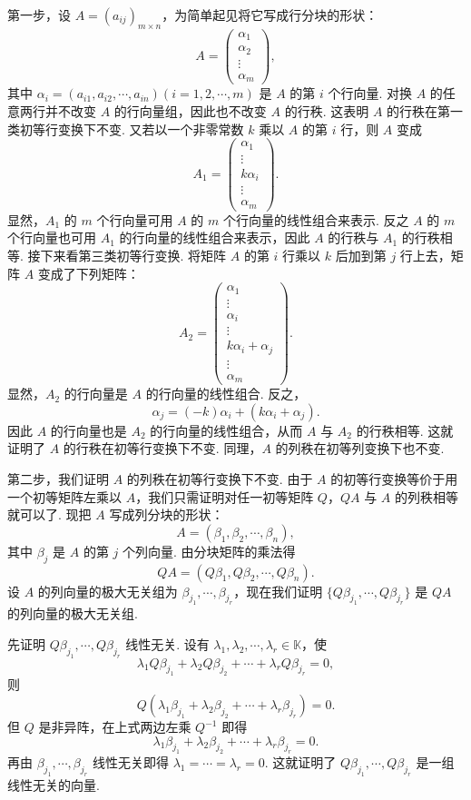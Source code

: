\documentclass[UTF8,12pt,a4paper,fontset=fandol]{ctexart}
\begin{document}
第一步，设 $A=(a_{ij})_{m\times n}$，为简单起见将它写成行分块的形状：
\[
A=\left(\begin{array}{c}
\alpha_1\\
\alpha_2\\
\vdots\\
\alpha_m
\end{array}\right),
\]
其中 $\alpha_i=(a_{i1},a_{i2},\cdots,a_{in})(i=1,2,\cdots,m)$ 是 $A$ 的第 $i$ 个行向量. 对换 $A$ 的任意两行并不改变 $A$ 的行向量组，因此也不改变 $A$ 的行秩. 这表明 $A$ 的行秩在第一类初等行变换下不变. 又若以一个非零常数 $k$ 乘以 $A$ 的第 $i$ 行，则 $A$ 变成
\[
A_1=\left(\begin{array}{c}
\alpha_1\\
\vdots\\
k\alpha_i\\
\vdots\\
\alpha_m
\end{array}\right).
\]
显然，$A_1$ 的 $m$ 个行向量可用 $A$ 的 $m$ 个行向量的线性组合来表示. 反之 $A$ 的 $m$ 个行向量也可用 $A_1$ 的行向量的线性组合来表示，因此 $A$ 的行秩与 $A_1$ 的行秩相等. 接下来看第三类初等行变换. 将矩阵 $A$ 的第 $i$ 行乘以 $k$ 后加到第 $j$ 行上去，矩阵 $A$ 变成了下列矩阵：
\[
A_2=\left(\begin{array}{c}
\alpha_1\\
\vdots\\
\alpha_i\\
\vdots\\
k\alpha_i+\alpha_j\\
\vdots\\
\alpha_m
\end{array}\right).
\]
显然，$A_2$ 的行向量是 $A$ 的行向量的线性组合. 反之，
\[
\alpha_j=(-k)\alpha_i+(k\alpha_i+\alpha_j).
\]
因此 $A$ 的行向量也是 $A_2$ 的行向量的线性组合，从而 $A$ 与 $A_2$ 的行秩相等. 这就证明了 $A$ 的行秩在初等行变换下不变. 同理，$A$ 的列秩在初等列变换下也不变.

第二步，我们证明 $A$ 的列秩在初等行变换下不变. 由于 $A$ 的初等行变换等价于用一个初等矩阵左乘以 $A$，我们只需证明对任一初等矩阵 $Q$，$QA$ 与 $A$ 的列秩相等就可以了. 现把 $A$ 写成列分块的形状：
\[
A=(\beta_1,\beta_2,\cdots,\beta_n),
\]
其中 $\beta_j$ 是 $A$ 的第 $j$ 个列向量. 由分块矩阵的乘法得
\[
QA=(Q\beta_1,Q\beta_2,\cdots,Q\beta_n).
\]
设 $A$ 的列向量的极大无关组为 $\beta_{j_1},\cdots,\beta_{j_r}$，现在我们证明 $\{Q\beta_{j_1},\cdots,Q\beta_{j_r}\}$ 是 $QA$ 的列向量的极大无关组.

先证明 $Q\beta_{j_1},\cdots,Q\beta_{j_r}$ 线性无关. 设有 $\lambda_1,\lambda_2,\cdots,\lambda_r\in\mathbb{K}$，使
\[
\lambda_1Q\beta_{j_1}+\lambda_2Q\beta_{j_2}+\cdots+\lambda_rQ\beta_{j_r}=0,
\]
则
\[
Q(\lambda_1\beta_{j_1}+\lambda_2\beta_{j_2}+\cdots+\lambda_r\beta_{j_r})=0.
\]
但 $Q$ 是非异阵，在上式两边左乘 $Q^{-1}$ 即得
\[
\lambda_1\beta_{j_1}+\lambda_2\beta_{j_2}+\cdots+\lambda_r\beta_{j_r}=0.
\]
再由 $\beta_{j_1},\cdots,\beta_{j_r}$ 线性无关即得 $\lambda_1=\cdots=\lambda_r=0$. 这就证明了 $Q\beta_{j_1},\cdots,Q\beta_{j_r}$ 是一组线性无关的向量.
\end{document}
